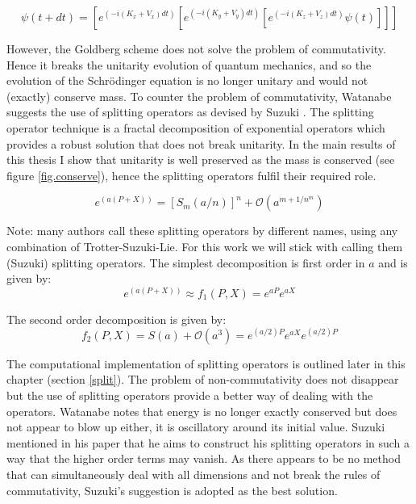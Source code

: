 \begin{equation}
\psi(t+dt) = [e^{(-i(K_x + V_x)dt)}  [e^{(-i(K_y + V_y)dt)}  [e^{(-i(K_z + V_z)dt)}\psi(t)]]]
\end{equation}

\noindent However, the Goldberg scheme does not solve the problem of commutativity. Hence it breaks the unitarity evolution of quantum mechanics, and so the evolution of the Schr\"odinger equation is no longer unitary and would not (exactly) conserve mass. To counter the problem of commutativity, Watanabe suggests the use of splitting operators as devised by Suzuki \citep{bib_suz}. The splitting operator technique is a fractal decomposition of exponential operators which provides a robust solution that does not break unitarity. In the main results of this thesis I show that unitarity is well preserved as the mass is conserved (see figure \ref{fig.conserve}), hence the splitting operators fulfil their required role.

\begin{equation}
 e^{(a(P + X))} = [S_m(a/n)]^n + \mathcal{O}(a^{m+1/n^m})
\end{equation}

\noindent Note: many authors call these splitting operators by different names, using any combination of Trotter-Suzuki-Lie. For this work we will stick with calling them (Suzuki) splitting operators. The simplest decomposition is first order in $a$ and is given by:
\begin{equation}
 e^{(a(P + X))} \approx f_1(P,X) = e^{aP}e^{aX}
\end{equation}

\noindent The second order decomposition is given by:
\begin{equation}
 f_2(P,X) = S(a) + \mathcal{O}(a^3) = e^{(a/2)P}e^{aX}e^{(a/2)P}
\end{equation}

\noindent The computational implementation of splitting operators is outlined later in this chapter (section \ref{split}). The problem of non-commutativity does not disappear but the use of splitting operators provide a better way of dealing with the operators. Watanabe notes that energy is no longer exactly conserved but does not appear to blow up either, it is oscillatory around its initial value. Suzuki mentioned in his paper that he aims to construct his splitting operators in such a way that the higher order terms may vanish. As there appears to be no method that can simultaneously deal with all dimensions and not break the rules of commutativity, Suzuki's suggestion is adopted as the best solution.

